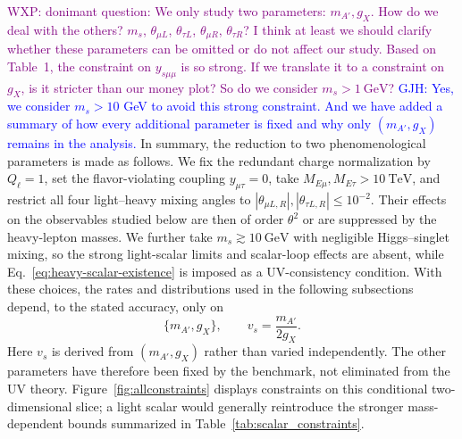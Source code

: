 \documentclass[onecolumn, aps, nofootinbib, prd, preprint, floats, floatfix, amsmath, amssymb, superscriptaddress, preprintnumbers]{revtex4-2}
\newcommand{\GJH}[1]{\textcolor{blue}{GJH: #1}}
\newcommand{\WXP}[1]{\textcolor{purple}{WXP: #1}}
\begin{document}
\WXP{donimant question: We only study two parameters: $m_{A'}, g_X$. How do we deal with the others? $m_s$, $\theta_{\mu L}$, $\theta_{\tau L}$, $\theta_{\mu R}$, $\theta_{\tau R}$? I think at least we should clarify whether these parameters can be omitted or do not affect our study. Based on Table~1, the constraint on $y_{s\mu\mu}$ is so strong. If we translate it to a constraint on $g_X$, is it stricter than our money plot? So do we consider $m_s>1~\mathrm{GeV}$?}
\GJH{Yes, we consider $m_s>10$ GeV to avoid this strong constraint. And we have added a summary of how every additional parameter is fixed and why only $(m_{A'},g_X)$ remains in the analysis.}
In summary, the reduction to two phenomenological parameters is made as follows. We fix the redundant charge normalization by $Q_\ell=1$, set the flavor-violating coupling $y_{\mu\tau}=0$, take $M_{E\mu},M_{E\tau}>10~\mathrm{TeV}$, and restrict all four light--heavy mixing angles to $|\theta_{\mu L,R}|,|\theta_{\tau L,R}|\leq10^{-2}$. Their effects on the observables studied below are then of order $\theta^2$ or are suppressed by the heavy-lepton masses. We further take $m_s\gtrsim10~\mathrm{GeV}$ with negligible Higgs--singlet mixing, so the strong light-scalar limits and scalar-loop effects are absent, while Eq.~\eqref{eq:heavy-scalar-existence} is imposed as a UV-consistency condition. With these choices, the rates and distributions used in the following subsections depend, to the stated accuracy, only on
\begin{equation}
\{m_{A'},g_X\},
\qquad
v_s=\frac{m_{A'}}{2g_X}.
\label{eq:reduced-parameter-space}
\end{equation}
Here $v_s$ is derived from $(m_{A'},g_X)$ rather than varied independently. The other parameters have therefore been fixed by the benchmark, not eliminated from the UV theory. Figure~\ref{fig:allconstraints} displays constraints on this conditional two-dimensional slice; a light scalar would generally reintroduce the stronger mass-dependent bounds summarized in Table~\ref{tab:scalar_constraints}.
\end{document}

